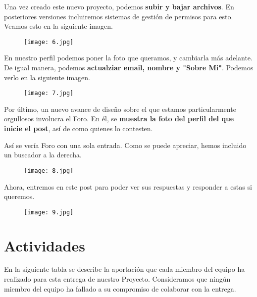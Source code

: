 \documentclass[12pt]{report}
\begin{document}
Una vez creado este nuevo proyecto, podemos \textbf{subir y bajar archivos}. En posteriores versiones incluiremos sistemas de gestión de permisos para esto. Veamos esto en la siguiente imagen.
\newpage

\begin{figure}[!h]
 \centering
  \texttt{[image: 6.jpg]}
\end{figure}

En nuestro perfil podemos poner la foto que queramos, y cambiarla más adelante. De igual manera, podemos \textbf{actualziar email, nombre y "Sobre Mi"}. Podemos verlo en la siguiente imagen.

\begin{figure}[!h]
 \centering
  \texttt{[image: 7.jpg]}
\end{figure}

Por último, un nuevo avance de diseño sobre el que estamos particularmente orgullosos involucra el Foro. En él, se \textbf{muestra la foto del perfil del que inicie el post}, así de como quienes lo contesten. 

Así se vería Foro con una sola entrada. Como se puede apreciar, hemos incluido un buscador a la derecha.

\begin{figure}[!h]
 \centering
  \texttt{[image: 8.jpg]}
\end{figure}

Ahora, entremos en este post para poder ver sus respuestas y responder a estas si queremos.

\begin{figure}[!h]
 \centering
  \texttt{[image: 9.jpg]}
\end{figure}

\section{Actividades}

En la siguiente tabla se describe la aportación que cada miembro del equipo ha realizado para esta entrega de nuestro Proyecto. Consideramos que ningún miembro del equipo ha fallado a su compromiso de colaborar con la entrega.
\end{document}
